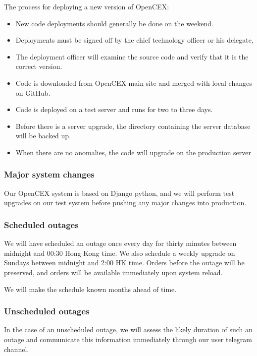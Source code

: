 The process for deploying a new version of OpenCEX:
\begin{itemize}
  \item New code deployments should generally be done on the weekend.
  \item Deployments must be signed off by the chief technology officer
    or his delegate,
  \item The deployment officer will examine the source code and verify
    that it is the correct version.
  \item Code is downloaded from OpenCEX main site and merged with
    local changes on GitHub.
  \item Code is deployed on a test server and runs for two to three days.
  \item Before there is a server upgrade, the directory containing the
    server database will be backed up.
  \item When there are no anomalies, the code will upgrade on the
    production server
\end{itemize}

\subsubsection{Major system changes}

Our OpenCEX system is based on Django python, and we will perform test
upgrades on our test system before pushing any major changes into
production.

\subsubsection{Scheduled outages}
We will have scheduled an outage once every day for thirty minutes
between midnight and 00:30 Hong Kong time.  We also schedule a weekly
upgrade on Sundays between midnight and 2:00 HK time.  Orders before
the outage will be preserved, and orders will be available immediately
upon system reload.

We will make the schedule known months ahead of time.

\subsubsection{Unscheduled outages}
In the case of an unscheduled outage, we will assess the likely duration of
such an outage and communicate this information immediately through
our user telegram channel.

